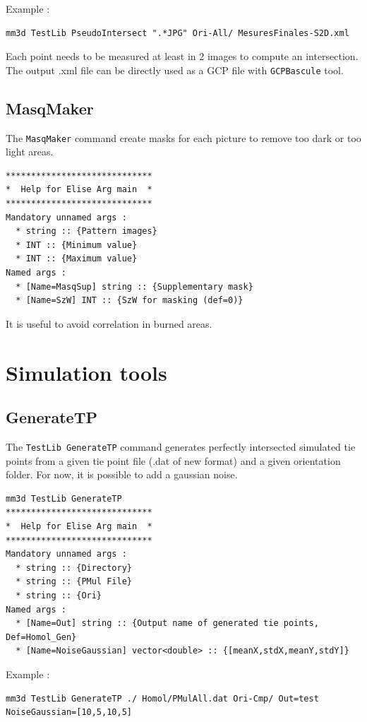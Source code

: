 Example :
\begin{verbatim}
mm3d TestLib PseudoIntersect ".*JPG" Ori-All/ MesuresFinales-S2D.xml
\end{verbatim}

Each point needs to be measured at least in 2 images to compute an intersection.
The output .xml file can be directly used as a GCP file with {\tt GCPBascule} tool.

\subsection{MasqMaker}
The {\tt MasqMaker} command create masks for each picture to remove too dark or too light areas.

\begin{verbatim}
*****************************
*  Help for Elise Arg main  *
*****************************
Mandatory unnamed args : 
  * string :: {Pattern images}
  * INT :: {Minimum value}
  * INT :: {Maximum value}
Named args : 
  * [Name=MasqSup] string :: {Supplementary mask}
  * [Name=SzW] INT :: {SzW for masking (def=0)}
\end{verbatim}

It is useful to avoid correlation in burned areas.

\section{Simulation tools}
\subsection{GenerateTP}
The {\tt TestLib GenerateTP} command generates perfectly intersected simulated tie points from a given tie point file (.dat of new format) and a given orientation folder. For now, it is possible to add a gaussian noise.

\begin{verbatim}
mm3d TestLib GenerateTP
*****************************
*  Help for Elise Arg main  *
*****************************
Mandatory unnamed args : 
  * string :: {Directory}
  * string :: {PMul File}
  * string :: {Ori}
Named args : 
  * [Name=Out] string :: {Output name of generated tie points, Def=Homol_Gen}
  * [Name=NoiseGaussian] vector<double> :: {[meanX,stdX,meanY,stdY]}
\end{verbatim}

Example :
\begin{verbatim}
mm3d TestLib GenerateTP ./ Homol/PMulAll.dat Ori-Cmp/ Out=test NoiseGaussian=[10,5,10,5]
\end{verbatim}

